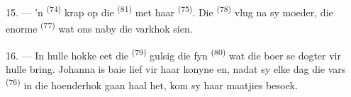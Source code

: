 15. --- 'n  \textsuperscript{(74)} krap op die 
\textsuperscript{(81)} met haar  \textsuperscript{(75)}. Die
 \textsuperscript{(78)} vlug na sy moeder, die enorme 
\textsuperscript{(77)} wat ons naby die varkhok sien.

16. --- In hulle hokke eet die  \textsuperscript{(79)} gulsig die fyn
 \textsuperscript{(80)} wat die boer se dogter vir hulle bring. Johanna is
baie lief vir haar konyne en, nadat sy elke dag die vars 
\textsuperscript{(76)} in die hoenderhok gaan haal het, kom sy haar maatjies besoek.
\VUsaut{6.0mm}
\VUfilet{22mm}
